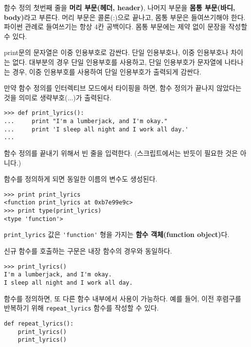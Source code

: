 함수 정의 첫번째 줄을 {\bf 머리 부문(헤더, header)}, 나머지 부문을 {\bf 몸통 부문(바디, body)}라고 부른다.
머리 부문은 콜론(:)으로 끝나고, 몸통 부문은 들여쓰기해야 한다.
파이썬 관례로 들여쓰기는 항상 4칸 공백이다. 
몸통 부문에는 제약 없이 문장을 작성할 수 있다.

print문의 문자열은 이중 인용부호로 감싼다. 
단일 인용부호나, 이중 인용부호나 차이는 없다.
대부분의 경우 단일 인용부호를 사용하고, 단일 인용부호가 문자열에 나타나는 경우, 이중 인용부호를 사용하여 단일 인용부호가 출력되게 감싼다.


만약 함수 정의를 인터렉티브 모드에서 타이핑을 하면, 
함수 정의가 끝나지 않았다는 것을 의미로 생략부호(...)가 출력된다.

\beforeverb
\begin{verbatim}
>>> def print_lyrics():
...     print "I'm a lumberjack, and I'm okay."
...     print 'I sleep all night and I work all day.'
...
\end{verbatim}
\afterverb
%

함수 정의를 끝내기 위해서 빈 줄을 입력한다. (스크립트에서는 반듯이 필요한 것은 아니다.) 

함수를 정의하게 되면 동일한 이름의 변수도 생성된다.

\beforeverb
\begin{verbatim}
>>> print print_lyrics
<function print_lyrics at 0xb7e99e9c>
>>> print type(print_lyrics)
<type 'function'>
\end{verbatim}
\afterverb
%

\verb"print_lyrics" 값은 \verb"'function'" 형을 가지는 {\bf 함수 객체(function object)}다. 


신규 함수를 호출하는 구문은 내장 함수의 경우와 동일하다.

\beforeverb
\begin{verbatim}
>>> print_lyrics()
I'm a lumberjack, and I'm okay.
I sleep all night and I work all day.
\end{verbatim}
\afterverb
%

함수를 정의하면, 또 다른 함수 내부에서 사용이 가능하다.
예를 들어, 이전 후렴구를 반복하기 위해 \verb"repeat_lyrics" 함수를 작성할 수 있다.

\beforeverb
\begin{verbatim}
def repeat_lyrics():
    print_lyrics()
    print_lyrics()
\end{verbatim}
\afterverb
%


